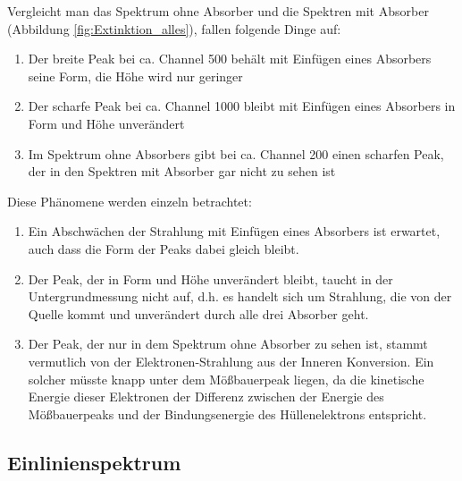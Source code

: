 \documentclass[12pt,a4paper]{article}
\begin{document}
Vergleicht man das Spektrum ohne Absorber und die Spektren mit Absorber (Abbildung \ref{fig:Extinktion_alles}), fallen folgende Dinge auf:
\begin{enumerate}
\item Der breite Peak bei ca. Channel 500 behält mit Einfügen eines Absorbers seine Form, die Höhe wird nur geringer
\item Der scharfe Peak bei ca. Channel 1000 bleibt mit Einfügen eines Absorbers in Form und Höhe unverändert
\item Im Spektrum ohne Absorbers gibt bei ca. Channel 200 einen scharfen Peak, der in den Spektren mit Absorber gar nicht zu sehen ist
\end{enumerate}
Diese Phänomene werden einzeln betrachtet:
\begin{enumerate}
\item Ein Abschwächen der Strahlung mit Einfügen eines Absorbers ist erwartet, auch dass die Form der Peaks dabei gleich bleibt.
\item Der Peak, der in Form und Höhe unverändert bleibt, taucht in der Untergrundmessung nicht auf, d.h. es handelt sich um Strahlung, die von der Quelle kommt und unverändert durch alle drei Absorber geht.
\item Der Peak, der nur in dem Spektrum ohne Absorber zu sehen ist, stammt vermutlich von der Elektronen-Strahlung aus der Inneren Konversion. Ein solcher müsste knapp unter dem Mößbauerpeak liegen, da die kinetische Energie dieser Elektronen der Differenz zwischen der Energie des Mößbauerpeaks und der Bindungsenergie des Hüllenelektrons entspricht.
\end{enumerate}

\subsection{Einlinienspektrum}
\end{document}
